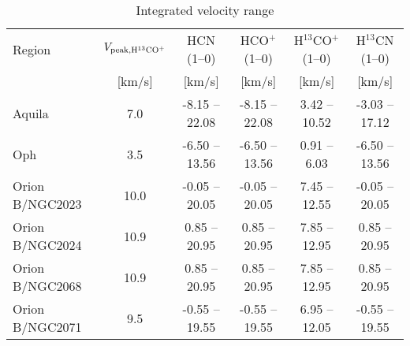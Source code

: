 \begin{table*}
\centering
\begin{threeparttable}
\caption{Integrated velocity range\label{table:integ_range}}
\begin{tabular}{lccccc}
\hline
Region &  $V_{\rm peak, H^{13}CO^+}$  & HCN (1--0) & HCO$^{+}$ (1--0) & H$^{13}$CO$^+$ (1--0) &  H$^{13}$CN (1--0) \\
            &  [km/s]  & [km/s]  & [km/s]  & [km/s]  & [km/s]   \\
\hline
Aquila  & 7.0 & -8.15 -- 22.08 &  -8.15 -- 22.08   & 3.42 -- 10.52 & -3.03 -- 17.12 \\
Oph     & 3.5 & -6.50 -- 13.56 & -6.50 -- 13.56   & 0.91 -- 6.03   & -6.50 -- 13.56 \\
Orion B/NGC2023 & 10.0 &  -0.05 -- 20.05 & -0.05 -- 20.05 & 7.45 -- 12.55 & -0.05 -- 20.05 \\
Orion B/NGC2024 & 10.9 &  0.85 -- 20.95 & 0.85 -- 20.95 & 7.85 -- 12.95 & 0.85 -- 20.95 \\
Orion B/NGC2068 & 10.9 &  0.85 -- 20.95 &  0.85 -- 20.95 & 7.85 -- 12.95 & 0.85 -- 20.95 \\
Orion B/NGC2071 & 9.5 &  -0.55 -- 19.55 &  -0.55 -- 19.55 & 6.95 -- 12.05 & -0.55 -- 19.55 \\
\hline
\end{tabular}
\end{threeparttable}
\end{table*}

